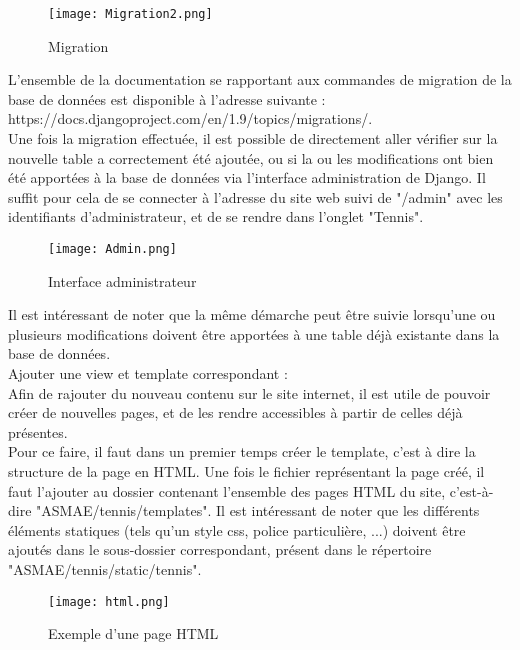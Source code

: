 \begin{figure}[H]
\centering
\texttt{[image: Migration2.png]}
\caption{Migration}
\end{figure}

L'ensemble de la documentation se rapportant aux commandes de migration de la base de données est disponible à l'adresse suivante : https://docs.djangoproject.com/en/1.9/topics/migrations/.\\

Une fois la migration effectuée, il est possible de directement aller vérifier sur la nouvelle table a correctement été ajoutée, ou si la ou les modifications ont bien été apportées à la base de données via l'interface administration de Django. Il suffit pour cela de se connecter à l'adresse du site web suivi de "/admin" avec les identifiants d'administrateur, et de se rendre dans l'onglet "Tennis".\\

\begin{figure}[H]
\centering
\texttt{[image: Admin.png]}
\caption{Interface administrateur}
\end{figure}

Il est intéressant de noter que la même démarche peut être suivie lorsqu'une ou plusieurs modifications doivent être apportées à une table déjà existante dans la base de données.\\

Ajouter une view et template correspondant :\\

Afin de rajouter du nouveau contenu sur le site internet, il est utile de pouvoir créer de nouvelles pages, et de les rendre accessibles à partir de celles déjà présentes.\\

Pour ce faire, il faut dans un premier temps créer le template, c'est à dire la structure de la page en HTML. Une fois le fichier représentant la page créé, il faut l'ajouter au dossier contenant l'ensemble des pages HTML du site, c'est-à-dire "ASMAE/tennis/templates". Il est intéressant de noter que les différents éléments statiques (tels qu'un style css, police particulière, ...) doivent être ajoutés dans le sous-dossier correspondant, présent dans le répertoire "ASMAE/tennis/static/tennis".\\

\begin{figure}[H]
\centering
\texttt{[image: html.png]}
\caption{Exemple d'une page HTML}
\end{figure}

